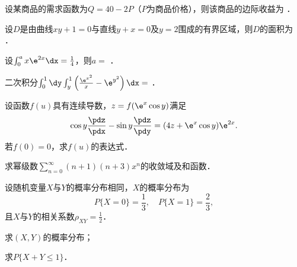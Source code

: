\documentclass[plain,noanswer,medmath]{../../template/jnuexam}
\begin{document}
\begin{problem}
设某商品的需求函数为$Q = 40 - 2P$（$P$为商品价格），则该商品的边际收益为 \fillin{}．
\end{problem}


\begin{problem}
设$D$是由曲线$xy + 1 = 0$与直线$y + x = 0$及$y = 2$围成的有界区域，则$D$的面积为 \fillin{}．
\end{problem}


\begin{problem}
设$\int_0^a x\e^{2x} \dx = \frac{1}{4}$，则$a =$ \fillin{}．
\end{problem}


\begin{problem}
二次积分$\int_0^1 \dy \int_y^1 \left(\frac{\e^{x^2}}{x} - \e^{y^2} \right)\dx =$ \fillin{}．
\end{problem}












\begin{problem}[points=10]%
设函数$f(u)$具有连续导数，$z = f(\e^x\cos y)$满足
$$\cos y\frac{\pdz}{\pdx} - \sin y\frac{\pdz}{\pdy} = (4z + \e^x\cos y) \e^{2x}.$$
若$f(0) = 0$，求$f(u)$的表达式．
\end{problem}


\begin{problem}[points=10]
求幂级数$\sum_{n = 0}^{\infty}(n + 1)(n + 3)x^n$的收敛域及和函数．
\end{problem}










\begin{problem}[points=11]
设随机变量$X$与$Y$的概率分布相同，$X$的概率分布为
$$P\{X = 0\} = \frac{1}{3},\quad P\{X = 1\} = \frac{2}{3},$$
且$X$与$Y$的相关系数$\rho_{XY} = \frac{1}{2}$．\par
\begin{enumerate*}
\item 求$(X,Y)$的概率分布；
\item 求$P\{X + Y \le 1\}$．
\end{enumerate*}
\end{problem}
\end{document}
